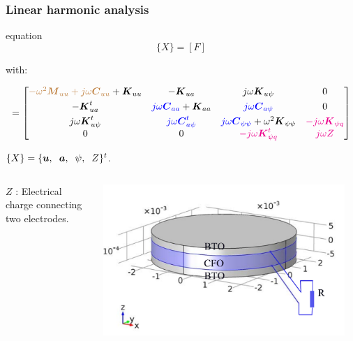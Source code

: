 \documentclass[compress]{beamer}
\begin{document}
\begin{frame}\frametitle{Linear harmonic analysis}
\begin{beamercolorbox}[center]{equation}
      \begin{equation*}
		[\mathbb{K}] \{ X \}=[F]
		\end{equation*}
\end{beamercolorbox}
with:
\begin{itemize} [label=$\bullet$, font=\small, leftmargin=*]
{\small
\item  \begin{equation*} 
[\mathbb{K}] = \begin{bmatrix}
       {\color{brown}-\omega^2\boldsymbol{M}_{uu} + j\omega\boldsymbol{C}_{uu}} + \boldsymbol{K}_{uu} & - \boldsymbol{K}_{ua} & j\omega\boldsymbol{K}_{u\psi} & 0\\[0.3em]
       -\boldsymbol{K}_{ua}^t & {\color{blue}j\omega\boldsymbol{C}_{aa}} + \boldsymbol{K}_{aa} & {\color{blue}j\omega\boldsymbol{C}_{a\psi}} & 0 \\[0.3em]
       j\omega\boldsymbol{K}_{u\psi}^t & {\color{blue}j\omega\boldsymbol{C}_{a\psi}^t} & {\color{blue}j\omega\boldsymbol{C}_{\psi \psi}} + \omega^2\boldsymbol{K}_{\psi \psi} & {\color{magenta}-j\omega\boldsymbol{K}_{\psi q}} \\
       0 & 0 & {\color{magenta}-j\omega\boldsymbol{K}_{\psi q}^t} & {\color{magenta}j\omega Z}
\end{bmatrix}
\end{equation*}
}
\item $\{ X \} = \{\boldsymbol{u},\hspace{0.2cm} \boldsymbol{a},\hspace{0.2cm} \psi,\hspace{0.2cm} Z \}^t$.
\end{itemize}
\begin{columns}[totalwidth=\textwidth] 
	\begin{column}{.5\textwidth}  
$Z$ : Electrical charge connecting two electrodes.
	\end{column}
	\begin{column}{.4\textwidth}  
\includegraphics[width=0.95\textwidth]{Graphic/01_geoMEcircu.pdf}
	\end{column}
	\end{columns}
\end{frame}
\end{document}
